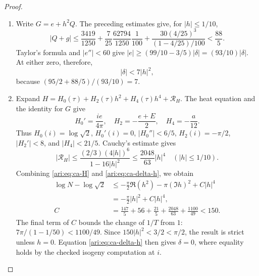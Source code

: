 \begin{proof}
\begin{enumerate}[label=\arabic*.,leftmargin=*]
\item Write $G=e+h^2Q$. The preceding estimates give, for $|h|\le1/10$,
\[
 |Q+g|\le
 \frac{3419}{1250}+\frac7{25}\frac{62794}{1250}\frac1{100}
       +\frac{30(4/25)^3}{(1-4/25)/100}<\frac{88}{5}.
\]
Taylor's formula and $|e''|<60$ give
$|e|\ge(99/10-3/5)|\delta|=(93/10)|\delta|$.
At either zero, therefore,
\begin{equation}\label{ari:eq:ca-delta-h}
 |\delta|<7|h|^2,
\end{equation}
because $(95/2+88/5)/(93/10)=7$.

\item Expand
$H=H_0(\tau)+H_2(\tau)h^2+H_4(\tau)h^4+\mathcal R_H$.
The heat equation and the identity for $G$ give
\[
 H_0'=\frac{ie}{4\pi},\quad
 H_2=-\frac{e+E}{2},\quad H_4=-\frac a{12}.
\]
Thus $H_0(i)=\log\sqrt2$, $H_0'(i)=0$,
$|H_0''|<6/5$, $H_2(i)=-\pi/2$, $|H_2'|<8$, and
$|H_4|<21/5$. Cauchy's estimate gives
\[
 |\mathcal R_H|\le
 \frac{(2/3)(4|h|)^6}{1-16|h|^2}
 \le\frac{2048}{63}|h|^4
 \quad (|h|\le1/10).
\]
Combining \eqref{ari:eq:ca-H} and \eqref{ari:eq:ca-delta-h}, we obtain
\begin{align*}
 \log N-\log\sqrt2
 &\le-\frac\pi2\Re(h^2)-\pi(\Im h)^2+C|h|^4\\
 &=-\frac\pi2|h|^2+C|h|^4,\\
 C&=\frac{147}{5}+56+\frac{21}{5}
                 +\frac{2048}{63}+\frac{1100}{49}<150.
\end{align*}
The final term of $C$ bounds the change of $1/T$ from $1$:
$7\pi/(1-1/50)<1100/49$. Since $150|h|^2<3/2<\pi/2$,
the result is strict unless $h=0$. Equation
\eqref{ari:eq:ca-delta-h} then gives $\delta=0$, where equality
holds by the checked isogeny computation at $i$.
\end{enumerate}
\end{proof}

